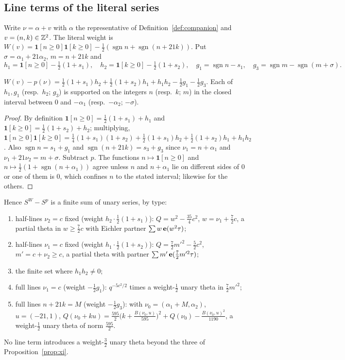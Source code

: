 \subsection{Line terms of the literal series}
Write $\nu=\alpha+v$ with $\alpha$ the representative of Definition~\ref{def:companion} and $v=(n,k)\in\mathbb{Z}^2$. The literal weight is
$W(v)=\mathbf 1[n\ge0]\mathbf 1[k\ge0]-\frac12(\operatorname{sgn}n+\operatorname{sgn}(n+21k))$. Put $\sigma=\alpha_1+21\alpha_2$, $m=n+21k$ and
\[ h_1=\mathbf 1[n\ge0]-\tfrac12(1+s_1),\quad h_2=\mathbf 1[k\ge0]-\tfrac12(1+s_2),\quad g_1=\operatorname{sgn}n-s_1,\quad g_3=\operatorname{sgn}m-\operatorname{sgn}(m+\sigma). \]
\begin{proposition}\label{prop:lines}
$W(v)-p(\nu)=\frac12(1+s_1)h_2+\frac12(1+s_2)h_1+h_1h_2-\frac12g_1-\frac12g_3$. Each of $h_1,g_1$ (resp.\ $h_2$; $g_3$) is supported on the integers $n$ (resp.\ $k$; $m$)
in the closed interval between $0$ and $-\alpha_1$ (resp.\ $-\alpha_2$; $-\sigma$).
\end{proposition}
\begin{proof}
By definition $\mathbf 1[n\ge0]=\frac12(1+s_1)+h_1$ and $\mathbf 1[k\ge0]=\frac12(1+s_2)+h_2$; multiplying, $\mathbf 1[n\ge0]\mathbf 1[k\ge0]=\frac14(1+s_1)(1+s_2)+\frac12(1+s_1)h_2+
\frac12(1+s_2)h_1+h_1h_2$. Also $\operatorname{sgn}n=s_1+g_1$ and $\operatorname{sgn}(n+21k)=s_3+g_3$ since $\nu_1=n+\alpha_1$ and $\nu_1+21\nu_2=m+\sigma$. Subtract $p$.
The functions $n\mapsto\mathbf 1[n\ge0]$ and $n\mapsto\frac12(1+\operatorname{sgn}(n+\alpha_1))$ agree unless $n$ and $n+\alpha_1$ lie on different sides of $0$ or one of them is $0$,
which confines $n$ to the stated interval; likewise for the others.
\end{proof}
Hence $S^W-S^p$ is a finite sum of unary series, by type:
\begin{enumerate}[label=(\alph*),leftmargin=2em]
\item half-lines $\nu_2=c$ fixed (weight $h_2\cdot\frac12(1+s_1)$): $Q=w^2-\frac{35}4c^2$, $w=\nu_1+\frac72c$, a partial theta in $w\ge\frac72c$ with Eichler partner $\sum w\,\mathbf{e}(w^2\tau)$;
\item half-lines $\nu_1=c$ fixed (weight $h_1\cdot\frac12(1+s_2)$): $Q=\frac72m'^2-\frac52c^2$, $m'=c+\nu_2\ge c$, a partial theta with partner $\sum m'\,\mathbf{e}(\frac72m'^2\tau)$;
\item the finite set where $h_1h_2\ne0$;
\item full lines $\nu_1=c$ (weight $-\frac12g_1$): $q^{-5c^2/2}$ times a weight-$\frac12$ unary theta in $\frac72m'^2$;
\item full lines $n+21k=M$ (weight $-\frac12g_3$): with $\nu_0=(\alpha_1+M,\alpha_2)$, $u=(-21,1)$, $Q(\nu_0+ku)=\frac{595}2\big(k+\frac{B(\nu_0,u)}{595}\big)^2+Q(\nu_0)-\frac{B(\nu_0,u)^2}{1190}$,
a weight-$\frac12$ unary theta of norm $\frac{595}2$.
\end{enumerate}
No line term introduces a weight-$\frac32$ unary theta beyond the three of Proposition~\ref{prop:xi}.

